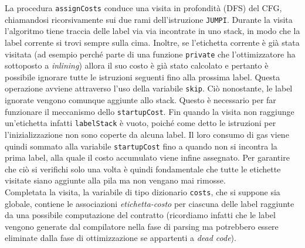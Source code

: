 \documentclass[12pt,a4paper,openright,oneside]{report}
\theoremstyle{definition}
\begin{document}
La procedura \texttt{assignCosts} conduce una visita in profondit\`{a} (DFS) del CFG, chiamandosi ricorsivamente sui due rami dell'istruzione \texttt{JUMPI}. Durante la visita l'algoritmo tiene traccia delle label via via incontrate in uno stack, in modo che la label corrente si trovi sempre sulla cima. 
Inoltre, se l'etichetta corrente \`{e} gi\`{a} stata visitata (ad esempio perch\'{e} parte di una funzione \texttt{private} che l'ottimizzatore ha sottoposto a \textit{inlining}) allora il suo costo \`{e} gi\`{a} stato calcolato e pertanto \`{e} possibile ignorare tutte le istruzioni seguenti fino alla prossima label. Questa operazione avviene attraverso l'uso della variabile \texttt{skip}. Ci\`{o} nonostante, le label ignorate vengono comunque aggiunte allo stack. Questo \`{e} necessario per far funzionare il meccanismo dello \texttt{startupCost}. Fin quando la visita non raggiunge un'etichetta infatti \texttt{labelStack} \`{e} vuoto, poich\'{e} come detto le istruzioni per l'inizializzazione non sono coperte da alcuna label. Il loro consumo di gas viene quindi sommato alla variabile \texttt{startupCost} fino a quando non si incontra la prima label, alla quale il costo accumulato viene infine assegnato. Per garantire che ci\`{o} si verifichi solo una volta \`{e} quindi fondamentale che tutte le etichette visitate siano aggiunte alla pila ma non vengano mai rimosse.\\
Completata la visita, la variabile di tipo dizionario \texttt{costs}, che si suppone sia globale, contiene le associazioni \textit{etichetta-costo} per ciascuna delle label raggiunte da una possibile computazione del contratto (ricordiamo infatti che le label vengono generate dal compilatore nella fase di parsing ma potrebbero essere eliminate dalla fase di ottimizzazione se appartenti a \textit{dead code}).
\end{document}
